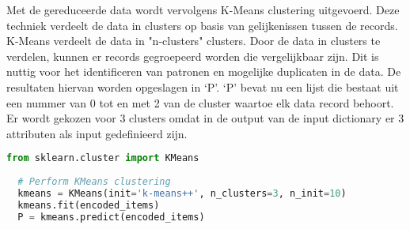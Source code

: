 Met de gereduceerde data wordt vervolgens K-Means clustering uitgevoerd. Deze techniek verdeelt de data in clusters op basis van gelijkenissen tussen de records. \\K-Means verdeelt de data in "n-clusters" clusters. Door de data in clusters te verdelen, kunnen er records gegroepeerd worden die vergelijkbaar zijn. Dit is nuttig voor het identificeren van patronen en mogelijke duplicaten in de data. De resultaten hiervan worden opgeslagen in ‘P’. ‘P’ bevat nu een lijst die bestaat uit een nummer van 0 tot en met 2 van de cluster waartoe elk data record behoort. Er wordt gekozen voor 3 clusters omdat in de output van de input dictionary er 3 attributen als input gedefinieerd zijn.
\begin{lstlisting}[language=Python, caption={Uitvoeren van K-Means clustering}]
  from sklearn.cluster import KMeans
  
  # Perform KMeans clustering
  kmeans = KMeans(init='k-means++', n_clusters=3, n_init=10)
  kmeans.fit(encoded_items)
  P = kmeans.predict(encoded_items)
\end{lstlisting}  


\section{}%
\label{sec:duplicateeDetectiePOC}

